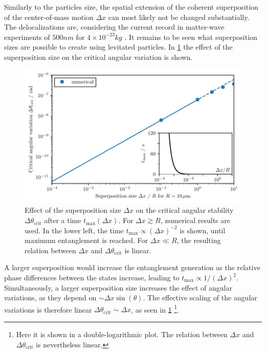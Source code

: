 Similarly to the particles size, the spatial extension of the coherent superposition of the center-of-mass motion $\Delta x$ can most likely not be changed substantially. The delocalizations are, considering the current record in matter-wave experiments of $500\si{nm}$ for $4\times 10^{-23}\si{kg}$ \cite{Fein_2019}. It remains to be seen what superposition sizes are possible to create using levitated particles.  
In \cref{fig:4:theta-crit-superposition-size} the effect of the superposition size on the critical angular variation is shown.
\begin{figure}[!htbp]
  \centering
  \includegraphics[width=\textwidth]{./../figures/theta-variance/theta-crit-superpos-size.pdf}
  \caption{Effect of the superposition size $\Delta x$ on the critical angular stability $\Delta \theta_\mathrm{crit}$ after a time $t_\mathrm{max}(\Delta x)$. For $\Delta x \gtrsim R$, numerical results are used. In the lower left, the time $t_\mathrm{max} \propto (\Delta x)^{-2}$ is shown, until maximum entanglement is reached. For $\Delta x \ll R$, the resulting relation between $\Delta x$ and $\Delta \theta_\mathrm{crit}$ is linear.}
  \label{fig:4:theta-crit-superposition-size}
\end{figure}
A larger superposition would increase the entanglement generation as the relative phase differences between the states increase, leading to $t_\mathrm{max} \propto 1/(\Delta x)^{2}$. 
Simultaneously, a larger superposition size increases the effect of angular variations, as they depend on $\sim \Delta x \sin(\theta)$.
The effective scaling of the angular variations is therefore linear $\Delta \theta_\mathrm{crit} \sim \Delta x$, as seen in \cref{fig:4:theta-crit-superposition-size} \footnote{Here it is shown in a double-logarithmic plot. The relation between $\Delta x$ and $\Delta \theta_\mathrm{crit}$ is nevertheless linear.}.



